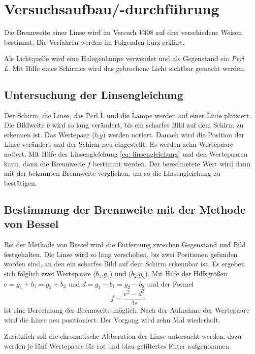 \section{Versuchsaufbau/-durchführung}
Die Brennweite einer Linse wird im Versuch $V408$ auf drei
verschiedene Weisen bestimmt.
Die Verfahren werden im Folgenden kurz erklärt.

Als Lichtquelle wird eine Halogenlampe verwendet und als
Gegenstand ein \emph{Perl L}. Mit Hilfe eines Schirmes wird %
das gebrochene Licht sichtbar gemacht werden.

\subsection{Untersuchung der Linsengleichung} %

Der Schirm, die Linse, das Perl L und die Lampe werden auf einer
Linie platziert.
Die Bildweite $b$ wird so lang verändert, bis ein scharfes Bild auf dem %
Schirm zu erkennen ist. Das Wertepaar ($b$,$g$) werden notiert.
Danach wird die Position der Linse verändert und der Schirm neu eingestellt. %
Es werden zehn Wertepaare notiert. %
Mit Hilfe der Linsengleichung \eqref{eq: linsengleichung} und den Wertepaaren kann, dann die
Brennweite $f$ bestimmt werden. Der berechnetete Wert wird dann mit der bekannten Brennweite
verglichen, um so die Linsengleichung zu bestätigen.  %

\subsection{Bestimmung der Brennweite mit der Methode von Bessel}
Bei der Methode von Bessel wird die Entfernung zwischen %
Gegenstand und Bild festgehalten. Die Linse wird so lang verschoben, bis zwei
Positionen gefunden worden sind, an den ein scharfes Bild auf dem Schirm erkennbar ist.
Es ergeben sich folglich zwei Wertepaare ($b_1$,$g_1$) und ($b_2$,$g_2$).
Mit Hilfe der Hilfsgrößen $e=g_1+b_1=g_2+b_2$ und $d=g_1-b_1=g_2-b_2$ und der Formel %
\begin{equation}
  \label{eq: bessel_methode}
  f=\frac{e^2-d^2}{4e}
\end{equation}
ist eine Berechnung der Brennweite möglich.
Nach der Aufnahme der Wertepaare wird die Linse neu positioniert.
Der Vorgang wird zehn Mal wiederholt.

Zusätzlich soll die chromatische Abberation der Linse untersucht werden,
dazu werden je fünf Wertepaare für rot und blau gefiltertes Filter
aufgenommen.
